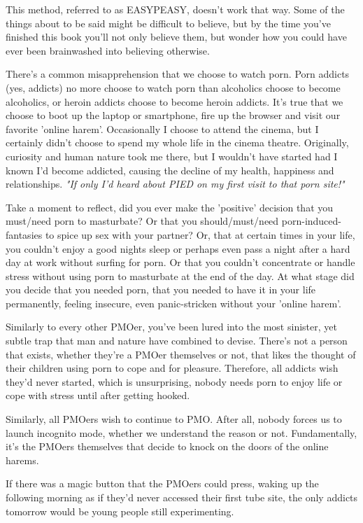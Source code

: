 \documentclass[easypeasy.tex]{subfiles}
\begin{document}
This method, referred to as EASYPEASY, doesn't work that way. Some of the things about to be said might be difficult to believe, but by the time you've finished this book you'll not only believe them, but wonder how you could have ever been brainwashed into believing otherwise.

There's a common misapprehension that we choose to watch porn. Porn addicts (yes, addicts) no more choose to watch porn than alcoholics choose to become alcoholics, or heroin addicts choose to become heroin addicts. It's true that we choose to boot up the laptop or smartphone, fire up the browser and visit our favorite 'online harem'. Occasionally I choose to attend the cinema, but I certainly didn't choose to spend my whole life in the cinema theatre. Originally, curiosity and human nature took me there, but I wouldn't have started had I known I'd become addicted, causing the decline of my health, happiness and relationships.
\textit{"If only I'd heard about PIED on my first visit to that porn site!"}

Take a moment to reflect, did you ever make the 'positive' decision that you must/need porn to masturbate? Or that you should/must/need porn-induced-fantasies to spice up sex with your partner? Or, that at certain times in your life, you couldn't enjoy a good nights sleep or perhaps even pass a night after a hard day at work without surfing for porn. Or that you couldn't concentrate or handle stress without using porn to masturbate at the end of the day. At what stage did you decide that you needed porn, that you needed to have it in your life permanently, feeling insecure, even panic-stricken without your 'online harem'.

Similarly to every other PMOer, you've been lured into the most sinister, yet subtle trap that man and nature have combined to devise. There's not a person that exists, whether they're a PMOer themselves or not, that likes the thought of their children using porn to cope and for pleasure. Therefore, all addicts wish they'd never started, which is unsurprising, nobody needs porn to enjoy life or cope with stress until after getting hooked.

Similarly, all PMOers wish to continue to PMO. After all, nobody forces us to launch incognito mode, whether we understand the reason or not. Fundamentally, it's the PMOers themselves that decide to knock on the doors of the online harems.

If there was a magic button that the PMOers could press, waking up the following morning as if they'd never accessed their first tube site, the only addicts tomorrow would be young people still experimenting.
\end{document}
